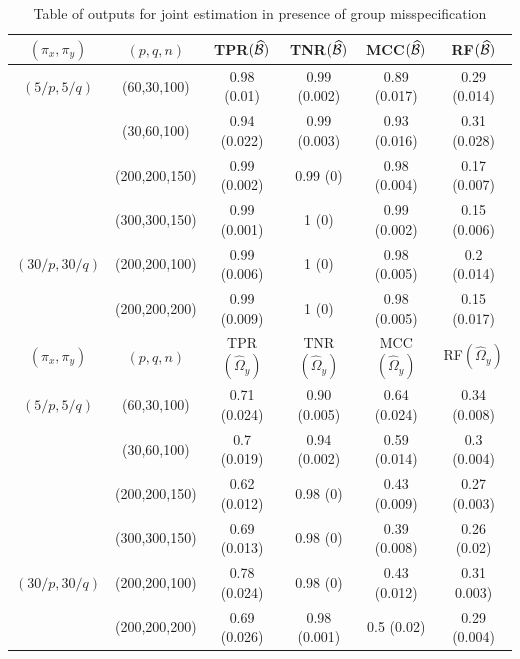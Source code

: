 \begin{scriptsize}
\begin{table}
\centering
    \begin{tabular}{cccccc}
    \hline
    $(\pi_x, \pi_y)$ & $(p,q,n)$   & TPR$(\widehat {{\cal{B}}})$            & TNR$(\widehat {{\cal{B}}})$             & MCC$(\widehat {{\cal{B}}})$ & RF$(\widehat {{\cal{B}}})$    \\ \hline
    $(5/p, 5/q)$   & (60,30,100)   & 0.98 (0.01)   & 0.99 (0.002)   & 0.89 (0.017)  & 0.29 (0.014) \\
    ~              & (30,60,100)   & 0.94 (0.022)  & 0.99 (0.003)   & 0.93 (0.016)  & 0.31 (0.028) \\
    ~              & (200,200,150) & 0.99 (0.002)  & 0.99 (0)       & 0.98 (0.004)  & 0.17 (0.007) \\
    ~              & (300,300,150) & 0.99 (0.001)  & 1 (0)          & 0.99 (0.002)  & 0.15 (0.006) \\
    $(30/p, 30/q)$ & (200,200,100) & 0.99 (0.006)  & 1 (0)          & 0.98 (0.005)  & 0.2 (0.014)  \\
    ~              & (200,200,200) & 0.99 (0.009)  & 1 (0)          & 0.98 (0.005)  & 0.15 (0.017) \\\hline
    \hline
    $(\pi_x, \pi_y)$ & $(p,q,n)$   & TPR$(\widehat \Omega_y)$            & TNR$(\widehat \Omega_y)$             & MCC$(\widehat \Omega_y)$ & RF$(\widehat \Omega_y)$            \\ \hline
    $(5/p, 5/q)$   & (60,30,100)   & 0.71 (0.024)  & 0.90 (0.005)   & 0.64 (0.024)  & 0.34 (0.008)\\
    ~              & (30,60,100)   & 0.7 (0.019)   & 0.94 (0.002)   & 0.59 (0.014)  & 0.3 (0.004) \\
    ~              & (200,200,150) & 0.62 (0.012)  & 0.98 (0)       & 0.43 (0.009)  & 0.27 (0.003)\\
    ~              & (300,300,150) & 0.69 (0.013)  & 0.98 (0)       & 0.39 (0.008)  & 0.26 (0.02) \\
    $(30/p, 30/q)$ & (200,200,100) & 0.78 (0.024)  & 0.98 (0)       & 0.43 (0.012)  & 0.31 0.003) \\
    ~              & (200,200,200) & 0.69 (0.026)  & 0.98 (0.001)   & 0.5 (0.02)    & 0.29 (0.004)\\\hline
    \end{tabular}
    \caption{Table of outputs for joint estimation in presence of group misspecification}
    \label{table:simtable2}
\end{table}
\end{scriptsize}

